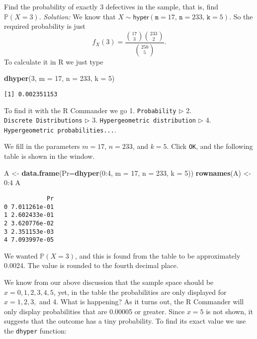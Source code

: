 \documentclass[]{book}
\newenvironment{Shaded}{\begin{snugshade}}{\end{snugshade}}
\newcommand{\KeywordTok}[1]{\textcolor[rgb]{0.13,0.29,0.53}{\textbf{{#1}}}}
\newcommand{\DataTypeTok}[1]{\textcolor[rgb]{0.13,0.29,0.53}{{#1}}}
\newcommand{\DecValTok}[1]{\textcolor[rgb]{0.00,0.00,0.81}{{#1}}}
\newcommand{\StringTok}[1]{\textcolor[rgb]{0.31,0.60,0.02}{{#1}}}
\newcommand{\NormalTok}[1]{{#1}}
\numberwithin{equation}{chapter}
\numberwithin{figure}{chapter}
\theoremstyle{plain}
\theoremstyle{definition}
\theoremstyle{remark}
\theoremstyle{definition}
\theoremstyle{definition}
\theoremstyle{remark}
\begin{document}
Find the probability of exactly 3 defectives in the sample, that is,
find \(\mathbb{P}(X=3)\). \emph{Solution:} We know that
\(X\sim\mathsf{hyper}(\mathtt{m}=17,\,\mathtt{n}=233,\,\mathtt{k}=5)\).
So the required probability is just \[ f_{X}(3)=\frac{{17 \choose 3}{233
\choose 2}}{{250 \choose 5}}.  \] To calculate it in R we just type

\begin{Shaded}
\begin{Highlighting}[]
\KeywordTok{dhyper}\NormalTok{(}\DecValTok{3}\NormalTok{, }\DataTypeTok{m =} \DecValTok{17}\NormalTok{, }\DataTypeTok{n =} \DecValTok{233}\NormalTok{, }\DataTypeTok{k =} \DecValTok{5}\NormalTok{)}
\end{Highlighting}
\end{Shaded}

\begin{verbatim}
[1] 0.002351153
\end{verbatim}

To find it with the R Commander we go 1. \texttt{Probability}
\(\triangleright\) 2. \texttt{Discrete\ Distributions}
\(\triangleright\) 3. \texttt{Hypergeometric\ distribution}
\(\triangleright\) 4. \texttt{Hypergeometric\ probabilities...}.

We fill in the parameters \(m = 17\), \(n = 233\), and \(k = 5\). Click
\texttt{OK}, and the following table is shown in the window.

\begin{Shaded}
\begin{Highlighting}[]
\NormalTok{A <-}\StringTok{ }\KeywordTok{data.frame}\NormalTok{(}\DataTypeTok{Pr=}\KeywordTok{dhyper}\NormalTok{(}\DecValTok{0}\NormalTok{:}\DecValTok{4}\NormalTok{, }\DataTypeTok{m =} \DecValTok{17}\NormalTok{, }\DataTypeTok{n =} \DecValTok{233}\NormalTok{, }\DataTypeTok{k =} \DecValTok{5}\NormalTok{))}
\KeywordTok{rownames}\NormalTok{(A) <-}\StringTok{ }\DecValTok{0}\NormalTok{:}\DecValTok{4} 
\NormalTok{A}
\end{Highlighting}
\end{Shaded}

\begin{verbatim}
            Pr
0 7.011261e-01
1 2.602433e-01
2 3.620776e-02
3 2.351153e-03
4 7.093997e-05
\end{verbatim}

We wanted \(\mathbb{P}(X=3)\), and this is found from the table to be
approximately 0.0024. The value is rounded to the fourth decimal place.

We know from our above discussion that the sample space should be
\(x=0,1,2,3,4,5\), yet, in the table the probabilities are only
displayed for \(x = 1,2,3,\) and 4. What is happening? As it turns out,
the R Commander will only display probabilities that are 0.00005 or
greater. Since \(x=5\) is not shown, it suggests that the outcome has a
tiny probability. To find its exact value we use the \texttt{dhyper}
function:
\end{document}

